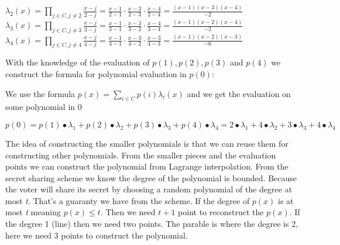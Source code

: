 \begin{center}
\begin{math} \lambda_2(x)=\prod\limits_{j\in C,j\neq2} \frac{x-j}{2-j} = \frac{x-1}{2-1} \cdot \frac{x-3}{2-3} \cdot \frac{x-4}{2-4}=\frac{(x-1)(x-3)(x-4)}{-2} \end{math}\\ 

\begin{math} \lambda_3(x)=\prod\limits_{j\in C,j\neq3} \frac{x-j}{3-j} = \frac{x-1}{3-1} \cdot \frac{x-3}{3-2} \cdot \frac{x-4}{3-4}=\frac{(x-1)(x-2)(x-4)}{-2} \end{math}\\ 

\begin{math} \lambda_4(x)=\prod\limits_{j\in C,j\neq4} \frac{x-j}{4-j} = \frac{x-1}{4-1} \cdot \frac{x-3}{4-2} \cdot \frac{x-3}{4-3}=\frac{(x-1)(x-2)(x-3)}{-6} \end{math}\\ 
\end{center}

\noindent
With the knowledge of the evaluation of \begin{math}p(1), p(2), p(3)\end{math} and  \begin{math}p(4)\end{math} we construct the formula for polynomial evaluation in \begin{math}p(0)\end{math}:


\noindent
\begin{infobox}
We use the formula \begin{math}p(x)=\sum\limits_{i \in C} p(i)\lambda_i(x)\end{math} and we get the evaluation on some polynomial in $0$
\begin{center}
\begin{math}p(0)=p(1)∙\lambda_1+p(2)∙\lambda_2+p(3)∙\lambda_3+p(4)∙\lambda_4=2∙\lambda_1+4∙\lambda_2+3∙\lambda_3+4∙\lambda_4 \end{math}
\end{center}
\label{info:Applying_Lagrange_polynomial_interpolation}
\end{infobox}



\noindent
The idea of constructing the smaller polynomials is that we can reuse them for constructing other polynomials. From the smaller pieces and the evaluation points we can construct the polynomial from Lagrange interpolation. From the secret sharing scheme we know the degree of the polynomial is bounded. Because the voter will share its secret by choosing a random polynomial of the degree at most \textit{t}. That’s a guaranty we have from the scheme. If the degree of $p(x)$ is at most \textit{t} meaning $p(x)\leq t$. Then we need $t+1$ point to reconstruct the $p(x)$. If the degree 1 (line) then we need two points. The parable is where the degree is 2, here we need 3 points to construct
the polynomial.

